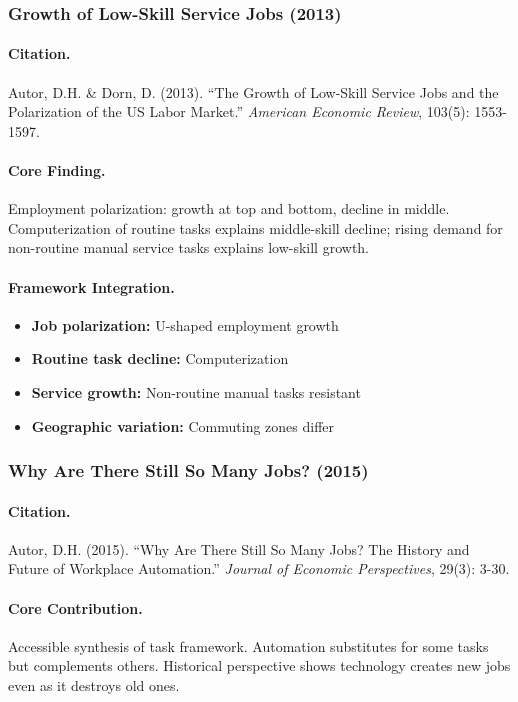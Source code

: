 \subsubsection{Growth of Low-Skill Service Jobs (2013)}

\paragraph{Citation.}
Autor, D.H. \& Dorn, D. (2013). ``The Growth of Low-Skill Service Jobs
and the Polarization of the US Labor Market.''
\emph{American Economic Review}, 103(5): 1553-1597.

\paragraph{Core Finding.}
Employment polarization: growth at top and bottom, decline in middle.
Computerization of routine tasks explains middle-skill decline; rising
demand for non-routine manual service tasks explains low-skill growth.

\paragraph{Framework Integration.}
\begin{itemize}
  \item \textbf{Job polarization:} U-shaped employment growth
  \item \textbf{Routine task decline:} Computerization
  \item \textbf{Service growth:} Non-routine manual tasks resistant
  \item \textbf{Geographic variation:} Commuting zones differ
\end{itemize}

\subsubsection{Why Are There Still So Many Jobs? (2015)}

\paragraph{Citation.}
Autor, D.H. (2015). ``Why Are There Still So Many Jobs? The History and
Future of Workplace Automation.''
\emph{Journal of Economic Perspectives}, 29(3): 3-30.

\paragraph{Core Contribution.}
Accessible synthesis of task framework. Automation substitutes for some
tasks but complements others. Historical perspective shows technology
creates new jobs even as it destroys old ones.

